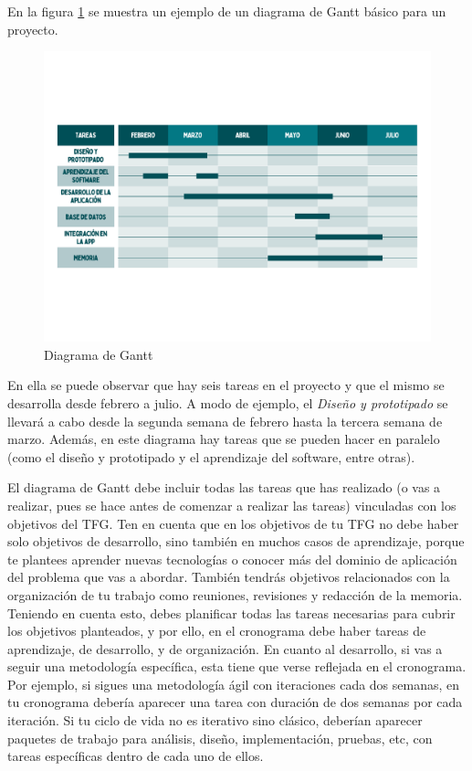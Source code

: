 En la figura \ref{fig:gantt} se muestra un ejemplo de un diagrama de Gantt básico para un proyecto.

\begin{figure}[!t]
    \centering
    \includegraphics[width=1.0\textwidth]{images/EjemploGantt.pdf}
    \caption{Diagrama de Gantt\label{fig:gantt}}
\end{figure}

En ella se puede observar que hay seis tareas en el proyecto y que el mismo se desarrolla desde febrero a julio. A modo de ejemplo, el \textit{Diseño y prototipado} se llevará a cabo desde la segunda semana de febrero hasta la tercera semana de marzo. Además, en este diagrama hay tareas que se pueden hacer en paralelo (como el diseño y prototipado y el aprendizaje del software, entre otras). %

El diagrama de Gantt debe incluir todas las tareas que has realizado (o vas a realizar, pues se hace antes de comenzar a realizar las tareas) vinculadas con los objetivos del TFG. Ten en cuenta que en los objetivos de tu TFG no debe haber solo objetivos de desarrollo, sino también en muchos casos de aprendizaje, porque te plantees aprender nuevas tecnologías o conocer más del dominio de aplicación del problema que vas a abordar. También tendrás objetivos relacionados con la organización de tu trabajo como reuniones, revisiones y redacción de la memoria. Teniendo en cuenta esto, debes planificar todas las tareas necesarias para cubrir los objetivos planteados, y por ello, en el cronograma debe haber tareas de aprendizaje, de desarrollo, y de organización. En cuanto al desarrollo, si vas a seguir una metodología específica, esta tiene que verse reflejada en el cronograma. Por ejemplo, si sigues una metodología ágil con iteraciones cada dos semanas, en tu cronograma debería aparecer una tarea con duración de dos semanas por cada iteración. Si tu ciclo de vida no es iterativo sino clásico, deberían aparecer paquetes de trabajo para análisis, diseño, implementación, pruebas, etc, con tareas específicas dentro de cada uno de ellos.

